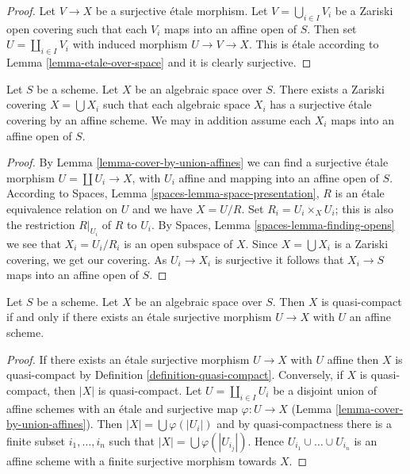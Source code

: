 \begin{proof}
Let $V \to X$ be a surjective \'etale morphism.
Let $V = \bigcup_{i \in I} V_i$ be a Zariski open covering
such that each $V_i$ maps into an affine open of $S$.
Then set $U = \coprod_{i \in I} V_i$ with induced morphism
$U \to V \to X$. This is \'etale according to
Lemma \ref{lemma-etale-over-space} and it is clearly surjective.
\end{proof}

\begin{lemma}
\label{lemma-union-of-quasi-compact}
Let $S$ be a scheme.
Let $X$ be an algebraic space over $S$.
There exists a Zariski covering $X = \bigcup X_i$
such that each algebraic space $X_i$ has a surjective
\'etale covering by an affine scheme. We may in addition assume
each $X_i$ maps into an affine open of $S$.
\end{lemma}

\begin{proof}
By Lemma \ref{lemma-cover-by-union-affines} we can find a surjective
\'etale morphism $U = \coprod U_i \to X$, with $U_i$ affine and mapping
into an affine open of $S$. According to
Spaces, Lemma \ref{spaces-lemma-space-presentation},
$R$ is an \'etale equivalence relation on $U$ and we have $X = U/R$. Set
$R_i = U_i \times_X U_i$; this is also the restriction $R|_{U_i}$ of $R$
to $U_i$. By
Spaces, Lemma \ref{spaces-lemma-finding-opens}
we see that $X_i = U_i/R_i$ is an open subspace of $X$. Since
$X = \bigcup X_i$ is a Zariski covering, we get our covering.
As $U_i \to X_i$ is surjective it follows that $X_i \to S$ maps into
an affine open of $S$.
\end{proof}

\begin{lemma}
\label{lemma-quasi-compact-affine-cover}
Let $S$ be a scheme.
Let $X$ be an algebraic space over $S$.
Then $X$ is quasi-compact if and only if
there exists an \'etale surjective morphism $U \to X$
with $U$ an affine scheme.
\end{lemma}

\begin{proof}
If there exists an \'etale surjective morphism $U \to X$ with $U$
affine then $X$ is quasi-compact by Definition \ref{definition-quasi-compact}.
Conversely, if $X$ is quasi-compact, then $|X|$ is quasi-compact.
Let $U = \coprod_{i \in I} U_i$ be a disjoint union of affine schemes
with an \'etale and surjective map $\varphi : U \to X$
(Lemma \ref{lemma-cover-by-union-affines}).
Then $|X| = \bigcup \varphi(|U_i|)$ and
by quasi-compactness there is a finite subset $i_1, \ldots, i_n$
such that $|X| = \bigcup \varphi(|U_{i_j}|)$. Hence
$U_{i_1} \cup \ldots \cup U_{i_n}$ is an affine scheme with a 
finite surjective morphism towards $X$.
\end{proof}

